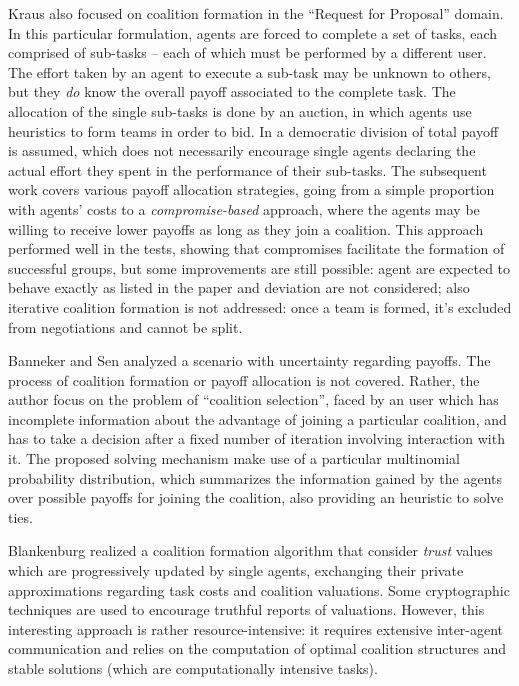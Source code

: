 \documentclass[11pt, twoside, titlepage, a4paper, openright]{report}
\begin{document}
Kraus \cite{Kraus:2003:CFU:860575.860577,Kraus:2004:ACC:1018410.1018806} also focused on coalition formation in the ``Request for Proposal'' domain. In this particular formulation, agents are forced to complete a set of tasks, each comprised of sub-tasks -- each of which must be performed by a different user. The effort taken by an agent to execute a sub-task may be unknown to others, but they \textit{do} know the overall payoff associated to the complete task.
The allocation of the single sub-tasks is done by an auction, in which agents use heuristics to form teams in order to bid. In \cite{Kraus:2003:CFU:860575.860577} a democratic division of total payoff is assumed, which does not necessarily encourage single agents declaring the actual effort they spent in the performance of their sub-tasks. The subsequent work \cite{Kraus:2004:ACC:1018410.1018806} covers various payoff allocation strategies, going from a simple proportion with agents' costs to a \textit{compromise-based} approach, where the agents may be willing to receive lower payoffs as long as they join a coalition. This approach performed well in the tests, showing that compromises facilitate the formation of successful groups, but some improvements are still possible: agent are expected to behave exactly as listed in the paper and deviation are not considered; also iterative coalition formation is not addressed: once a team is formed, it's excluded from negotiations and cannot be split.

\noindent Banneker and Sen \cite{Banerjee:2000:SP:336595.337478} analyzed a scenario with uncertainty regarding payoffs. The process of coalition formation or payoff allocation is not covered. Rather, the author focus on the problem of ``coalition selection'', faced by an user which has incomplete information about the advantage of joining a particular coalition, and has to take a decision after a fixed number of iteration involving interaction with it. The proposed solving mechanism make use of a particular multinomial probability distribution, which summarizes the information gained by the agents over possible payoffs for joining the coalition, also providing an heuristic to solve ties.

Blankenburg \cite{Blankenburg:2005:TKC:1082473.1082623} realized a coalition formation algorithm that consider \textit{trust} values which are progressively updated by single agents, exchanging their private approximations regarding task costs and coalition valuations. Some cryptographic techniques are used to encourage truthful reports of valuations. However, this interesting approach is rather resource-intensive: it requires extensive inter-agent communication and relies on the computation of optimal coalition structures and stable solutions (which are computationally intensive tasks).
\end{document}
